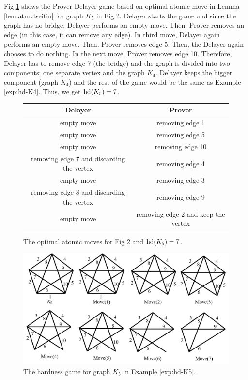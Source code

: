 \documentclass{report}
\begin{document}
\begin{examp}\label{exp:hd-K5}
Fig \ref{fig:game3} shows  the Prover-Delayer game based on optimal atomic move in Lemma \ref{lem:atmvtseitin} for graph $K_5$ in Fig \ref{fig:hd3}. Delayer starts the game and since the graph has no bridge, Delayer performs an empty move. Then, Prover removes an edge (in this case, it can remove any edge). In third move, Delayer again performs an empty move. Then, Prover removes edge 5. Then, the Delayer again chooses to do nothing. In the next move, Prover removes edge 10. Therefore, Delayer has to remove edge 7 (the bridge) and the graph is divided into two components: one separate vertex and the graph $K_4$. Delayer keeps the bigger component (graph $K_4$) and the rest of the game would be the same as Example \ref{exp:hd-K4}. Thus, we get $\operatorname{hd}(K_5)=7$.
  \begin{figure}%
  \centering
  \begin{tabular}{|c|c|} 
  \hline
                  Delayer & Prover \\ \hline
                  empty move & removing edge 1  \\ \hline
		  empty move & removing edge 5  \\ \hline
		  empty move & removing edge 10  \\ \hline
                  removing edge 7 and discarding the vertex & removing edge 4  \\ \hline
		  empty move & removing edge 3  \\ \hline
                  removing edge 8 and discarding the vertex & removing edge 9  \\ \hline
		  empty move & removing edge 2  and keep the vertex\\ \hline
  \end{tabular}
  \caption{The optimal atomic moves for Fig \ref{fig:hd3} and $\operatorname{hd}(K_5)=7$.} \label{fig:game3}
  \end{figure}
  \begin{figure}
  \begin{center}
  \includegraphics[scale =0.4]{g3.png}
  \caption{The hardness game for graph $K_5$ in Example \ref{exp:hd-K5}.} \label{fig:hd3}
  \end{center}
  \end{figure}
\end{examp}
\end{document}

